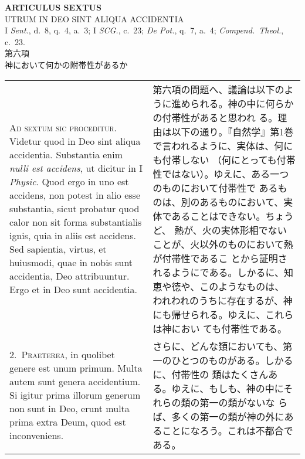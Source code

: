 \documentclass[10pt]{jsarticle} %
\begin{document}
\newpage
{}


\begin{center}
 {\Large {\bf ARTICULUS SEXTUS}}\\
 {\large UTRUM IN DEO SINT ALIQUA ACCIDENTIA}\\
 {\footnotesize I {\itshape Sent.}, d.~8, q.~4, a.~3; I {\itshape SCG.},
 c.~23; {\itshape De Pot.}, q.~7, a.~4; {\itshape Compend.~Theol.},
 c.~23.}\\
 {\Large 第六項\\神において何かの附帯性があるか}
\end{center}

\begin{longtable}{p{21em}p{21em}}

{\huge A}{\scshape d sextum sic proceditur}. Videtur quod in Deo sint aliqua
 accidentia. Substantia enim {\itshape nulli est accidens}, ut dicitur in I
 {\itshape Physic}. Quod ergo in uno est accidens, non potest in alio esse
 substantia, sicut probatur quod calor non sit forma substantialis
 ignis, quia in aliis est accidens. Sed sapientia, virtus, et huiusmodi,
 quae in nobis sunt accidentia, Deo attribuuntur. Ergo et in Deo sunt
 accidentia.

&

第六項の問題へ、議論は以下のように進められる。神の中に何らかの付帯性があると思われ
 る。理由は以下の通り。『自然学』第1巻で言われるように、実体は、何にも付帯しない
 （何にとっても付帯性ではない）。ゆえに、ある一つのものにおいて付帯性で
 あるものは、別のあるものにおいて、実体であることはできない。ちょうど、
 熱が、火の実体形相でないことが、火以外のものにおいて熱が付帯性であるこ
 とから証明されるようにである。しかるに、知恵や徳や、このようなものは、
 われわれのうちに存在するが、神にも帰せられる。ゆえに、これらは神におい
 ても付帯性である。


\\



2.~{\scshape Praeterea}, in quolibet genere est unum primum. Multa autem sunt
 genera accidentium. Si igitur prima illorum generum non sunt in Deo,
 erunt multa prima extra Deum, quod est inconveniens.

&

さらに、どんな類においても、第一のひとつのものがある。しかるに、付帯性の
 類はたくさんある。ゆえに、もしも、神の中にそれらの類の第一の類がないな
 らば、多くの第一の類が神の外にあることになろう。これは不都合である。


\end{longtable}
\end{document}
